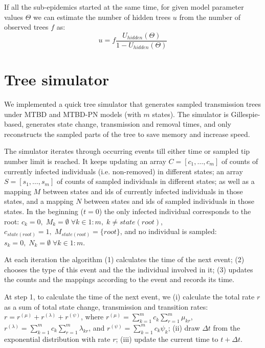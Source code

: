 \documentclass[a4paper,10pt]{article}
\begin{document}
If all the sub-epidemics started at the same time, for given model parameter values $\Theta$ we can estimate the number of hidden trees $u$ from the number of observed trees $f$ as:
\begin{equation}
u = f \frac{U_{hidden}(\Theta)}{1 - U_{hidden}(\Theta)}\label{eq:u} 
\end{equation}



\section{Tree simulator}
We implemented a quick tree simulator that generates sampled transmission trees under MTBD and MTBD-PN models (with $m$ states). The simulator is Gillespie-based, generates state change, transmission and removal times, and only reconstructs the sampled parts of the tree to save memory and increase speed. 

The simulator iterates through occurring events till either time or sampled tip number limit is reached. 
It keeps updating an array $C = [c_1, \ldots, c_m]$ of counts of currently infected individuals (i.e. non-removed) in different states; an array $S = [s_1, \ldots, s_m]$ of counts of sampled individuals in different states; as well as a mapping $M$ between states and ids of currently infected individuals in those states, and a mapping $N$ between states and ids of sampled individuals in those states.  In the beginning ($t=0$) the only infected individual corresponds to the root: $c_k = 0, \;M_k = \emptyset \; \forall k \in 1:m, \; k \neq state(root)$, $c_{state(root)} = 1, \; M_{state(root)} = \{root\}$, and no individual is sampled: $s_k=0,\;N_k = \emptyset \; \forall k \in 1:m$.

At each iteration the algorithm (1) calculates the time of the next event; (2) chooses the type of this event and the the individual involved in it; (3) updates the counts and the mappings according to the event and records its time.

At step 1, to calculate the time of the next event, we (i) calculate the total rate $r$ as a sum of total state change, transmission and transition rates: $r = r^{(\mu)} + r^{(\lambda)} + r^{(\psi)}$, where $r^{(\mu)} = \sum\limits_{k=1}^{m} c_k \sum\limits_{r=1}^{m} \mu_{kr}$, $r^{(\lambda)} = \sum\limits_{k=1}^{m} c_k \sum\limits_{r=1}^{m} \lambda_{kr}$, and $r^{(\psi)} = \sum\limits_{k=1}^{m} c_k \psi_{k}$; (ii) draw $\Delta t$ from the exponential distribution with rate $r$; (iii) update the current time to $t + \Delta t$.
\end{document}
